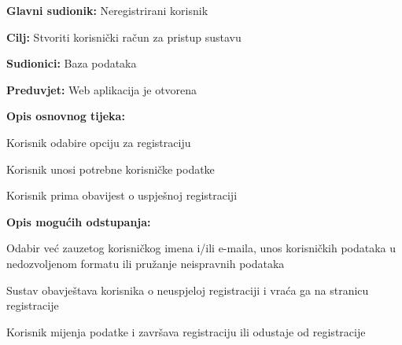 				\noindent {}
					\begin{packed_item}
	
						\item \textbf{Glavni sudionik: }Neregistrirani korisnik
						\item  \textbf{Cilj:} Stvoriti korisnički račun za pristup sustavu
						\item  \textbf{Sudionici:} Baza podataka
						\item  \textbf{Preduvjet:} Web aplikacija je otvorena
						\item  \textbf{Opis osnovnog tijeka:}
						
						\item[] \begin{packed_enum}
	
							\item Korisnik odabire opciju za registraciju
							\item Korisnik unosi potrebne korisničke podatke
							\item Korisnik prima obavijest o uspješnoj registraciji

						\end{packed_enum}
						
						\item  \textbf{Opis mogućih odstupanja:}
						
						\item[] \begin{packed_item}
	
							\item[2.a] Odabir već zauzetog korisničkog imena i/ili e-maila, unos korisničkih podataka u nedozvoljenom formatu ili pružanje neispravnih podataka
							
								\begin{packed_item}
								
									\item Sustav obavještava korisnika o neuspjeloj registraciji i vraća ga na stranicu registracije
									\item Korisnik mijenja podatke i završava registraciju ili odustaje od registracije
								
								\end{packed_item}
							
						\end{packed_item}					
					\end{packed_item}
					
